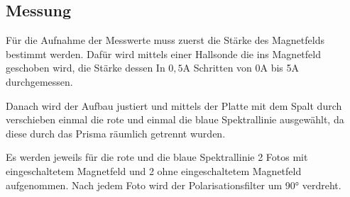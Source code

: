 \subsection{Messung}
Für die Aufnahme der Messwerte muss zuerst die Stärke des Magnetfelds bestimmt werden. Dafür wird mittels einer Hallsonde die ins Magnetfeld geschoben wird, die Stärke dessen In
$0,5$A Schritten von 0A bis 5A durchgemessen. 

\noindent
Danach wird der Aufbau justiert und mittels der Platte mit dem Spalt durch verschieben einmal die rote und einmal die blaue Spektrallinie ausgewählt, da diese durch das Prisma 
räumlich getrennt wurden. 

\noindent
Es werden jeweils für die rote und die blaue Spektrallinie 2 Fotos mit eingeschaltetem Magnetfeld und 2 ohne eingeschaltetem Magnetfeld aufgenommen. Nach jedem Foto wird der Polarisationsfilter
um 90° verdreht.

